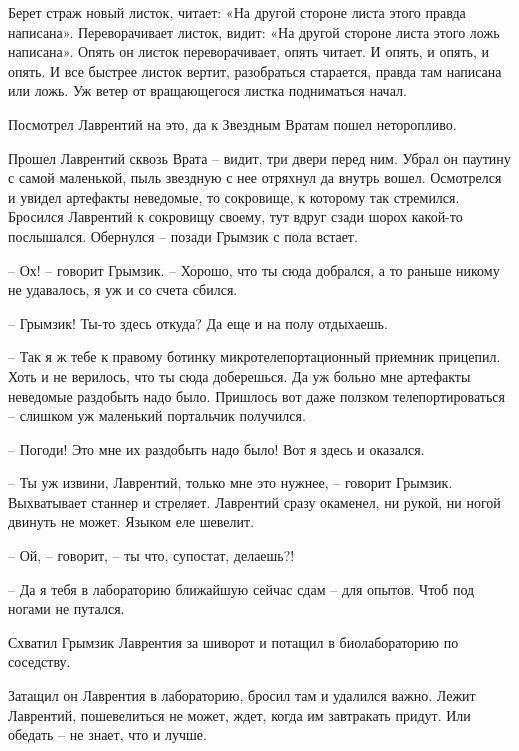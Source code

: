 \documentclass[ebook,oneside,final,openright]{memoir}
\begin{document}
\par
Берет страж новый листок, читает: «На другой стороне листа этого правда написана». Переворачивает листок, видит: «На другой стороне листа этого ложь написана». Опять он листок переворачивает, опять читает. И опять, и опять, и опять. И все быстрее листок вертит, разобраться старается, правда там написана или ложь. Уж ветер от вращающегося листка подниматься начал. \par
\par
Посмотрел Лаврентий на это, да к Звездным Вратам пошел неторопливо.\par
\par
\par
Прошел Лаврентий сквозь Врата – видит, три двери перед ним. Убрал он паутину с самой маленькой, пыль звездную с нее отряхнул да внутрь вошел. Осмотрелся и увидел артефакты неведомые, то сокровище, к которому так стремился. Бросился Лаврентий к сокровищу своему, тут вдруг сзади шорох какой-то послышался. Обернулся – позади Грымзик с пола встает.\par
– Ох! – говорит Грымзик. – Хорошо, что ты сюда добрался, а то раньше никому не удавалось, я уж и со счета сбился.\par
– Грымзик! Ты-то здесь откуда? Да еще и на полу отдыхаешь.\par
– Так я ж тебе к правому ботинку микротелепортационный приемник прицепил. Хоть и не верилось, что ты сюда доберешься. Да уж больно мне артефакты неведомые раздобыть надо было. Пришлось вот даже ползком телепортироваться – слишком уж маленький портальчик получился.\par
– Погоди! Это мне их раздобыть надо было! Вот я здесь и оказался.\par
– Ты уж извини, Лаврентий, только мне это нужнее, – говорит Грымзик. Выхватывает станнер и стреляет. Лаврентий сразу окаменел, ни рукой, ни ногой двинуть не может. Языком еле шевелит.\par
– Ой, – говорит, – ты что, супостат, делаешь?!\par
– Да я тебя в лабораторию ближайшую сейчас сдам – для опытов. Чтоб под ногами не путался.\par
Схватил Грымзик Лаврентия за шиворот и потащил в биолабораторию по соседству.\par
\par
Затащил он Лаврентия в лабораторию, бросил там и удалился важно. Лежит Лаврентий, пошевелиться не может, ждет, когда им завтракать придут. Или обедать – не знает, что и лучше. \par
\end{document}
